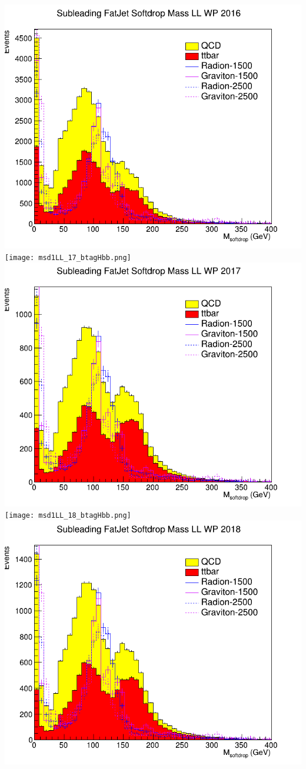 \includegraphics[width=1\textwidth]{msd1LL_16_deepTagMD_HbbvsQCD.png}
\texttt{[image: msd1LL\_17\_btagHbb.png]}
\includegraphics[width=1\textwidth]{msd1LL_17_deepTagMD_HbbvsQCD.png}
\texttt{[image: msd1LL\_18\_btagHbb.png]}
\includegraphics[width=1\textwidth]{msd1LL_18_deepTagMD_HbbvsQCD.png}
